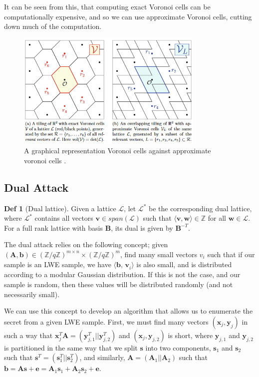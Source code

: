 \documentclass[a4paper, 10pt]{article}
\theoremstyle{definition}
\newtheorem{definition}{Def}[section]
\begin{document}
It can be seen from this, that computing exact Voronoi cells can be computationally expensive, and so we can use approximate Voronoi cells, cutting down much of the computation.

\begin{figure}[h]
    \centering
    \includegraphics[width = 0.8\textwidth]{approx_voronoi.png}
    \caption{A graphical representation Voronoi cells against approximate voronoi cells \cite{10.1007/978-3-030-25510-7_1}.}
\end{figure}


\subsection{Dual Attack}

\begin{definition}[Dual lattice]
    Given a lattice $\mathcal{L}$, let $\mathcal{L} ^*$ be the corresponding dual lattice, where $\mathcal{L} ^*$ contains all vectors $\mathbf{v} \in span(\mathcal{L})$ such that $\langle \mathbf{v}, \mathbf{w} \rangle \in \mathbb{Z}$ for all $\mathbf{w} \in \mathcal{L}$. For a full rank lattice with basis $\mathbf{B}$, its dual is given by $\mathbf{B}^{-T}$.
\end{definition}

The dual attack relies on the following concept; given $(\mathbf{A, b}) \in (\mathbb{Z}/q\mathbb{Z})^{m \times n} \times (\mathbb{Z}/q\mathbb{Z})^m$, find many small vectors $v_i$ such that if our sample is an \ac{LWE} sample, we have $\langle \textbf{b, v}_i \rangle$ is also small, and is distributed according to a modular Gaussian distribution. If this is not the case, and our sample is random, then these values will be distributed randomly (and not necessarily small).

We can use this concept to develop an algorithm that allows us to enumerate the secret from a given \ac{LWE} sample. First, we must find many vectors $(\mathbf{x}_j, \mathbf{y}_j)$ in such a way that $\mathbf{x}_j^T\mathbf{A}=(\mathbf{y}^T_{j,1}||\mathbf{y}^T_{j,2})$ and $(\mathbf{x}_j, \mathbf{y}_{j,2})$ is short, where $\mathbf{y}_{j,1}$ and $\mathbf{y}_{j,2}$ is partitioned in the same way that we split $\mathbf{s}$ into two components, $\mathbf{s}_1$ and $\mathbf{s}_2$ such that $\mathbf{s}^T = (\mathbf{s}_1^T||\mathbf{s}_2^T)$, and similarly, $\mathbf{A}=(\mathbf{A}_1||\mathbf{A}_2)$ such that $\mathbf{b}=\mathbf{As+e}=\mathbf{A}_1 \mathbf{s}_1 + \mathbf{A}_2 \mathbf{s}_2 + \mathbf{e}$.
\end{document}
